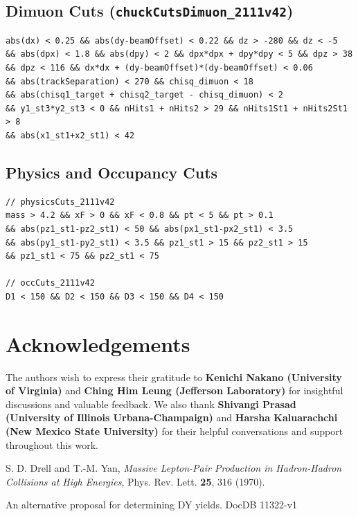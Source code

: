 \documentclass[11pt]{article}
\begin{document}
\subsection{Dimuon Cuts (\texttt{chuckCutsDimuon\_2111v42})}
\label{cut:chuck_dimuon}
{\small\begin{verbatim}
abs(dx) < 0.25 && abs(dy-beamOffset) < 0.22 && dz > -280 && dz < -5
&& abs(dpx) < 1.8 && abs(dpy) < 2 && dpx*dpx + dpy*dpy < 5 && dpz > 38
&& dpz < 116 && dx*dx + (dy-beamOffset)*(dy-beamOffset) < 0.06
&& abs(trackSeparation) < 270 && chisq_dimuon < 18
&& abs(chisq1_target + chisq2_target - chisq_dimuon) < 2
&& y1_st3*y2_st3 < 0 && nHits1 + nHits2 > 29 && nHits1St1 + nHits2St1 > 8
&& abs(x1_st1+x2_st1) < 42
\end{verbatim}}

\subsection{Physics and Occupancy Cuts}
\label{cut:physics_occ}
{\small\begin{verbatim}
// physicsCuts_2111v42
mass > 4.2 && xF > 0 && xF < 0.8 && pt < 5 && pt > 0.1
&& abs(pz1_st1-pz2_st1) < 50 && abs(px1_st1-px2_st1) < 3.5
&& abs(py1_st1-py2_st1) < 3.5 && pz1_st1 > 15 && pz2_st1 > 15
&& pz1_st1 < 75 && pz2_st1 < 75

// occCuts_2111v42
D1 < 150 && D2 < 150 && D3 < 150 && D4 < 150
\end{verbatim}}
\clearpage
\section*{Acknowledgements}
The authors wish to express their gratitude to \textbf{Kenichi Nakano (University of Virginia)} and \textbf{Ching Him Leung (Jefferson Laboratory)} for insightful discussions and valuable feedback. We also thank \textbf{Shivangi Prasad (University of Illinois Urbana-Champaign)} and \textbf{Harsha Kaluarachchi (New Mexico State University)} for their helpful conversations and support throughout this work.

\clearpage
\begin{thebibliography}{99}
    S. D. Drell and T.-M. Yan,
    \textit{Massive Lepton-Pair Production in Hadron-Hadron Collisions at High Energies},
    Phys. Rev. Lett. \textbf{25}, 316 (1970).
    
    An alternative proposal for determining DY yields. DocDB 11322-v1
    
\end{thebibliography}
\end{document}

